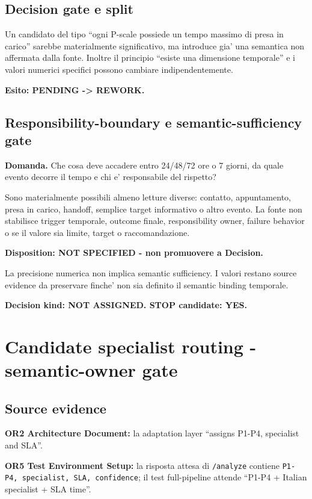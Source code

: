 \documentclass[11pt,a4paper]{article}
\begin{document}
\subsection{Decision gate e split}
Un candidato del tipo ``ogni P-scale possiede un tempo massimo di presa in carico'' sarebbe materialmente significativo, ma introduce gia' una semantica non affermata dalla fonte. Inoltre il principio ``esiste una dimensione temporale'' e i valori numerici specifici possono cambiare indipendentemente.\par
\textbf{Esito: PENDING -> REWORK.}

\subsection{Responsibility-boundary e semantic-sufficiency gate}
\begin{ddtacheck}
\textbf{Domanda.} Che cosa deve accadere entro 24/48/72 ore o 7 giorni, da quale evento decorre il tempo e chi e' responsabile del rispetto?
\end{ddtacheck}

Sono materialmente possibili almeno letture diverse: contatto, appuntamento, presa in carico, handoff, semplice target informativo o altro evento. La fonte non stabilisce trigger temporale, outcome finale, responsibility owner, failure behavior o se il valore sia limite, target o raccomandazione.

\begin{ddtaopen}[title={GAP-DERMA-SLA-01}]
\textbf{Disposition: NOT SPECIFIED - non promuovere a Decision.}\par
La precisione numerica non implica semantic sufficiency. I valori restano source evidence da preservare finche' non sia definito il semantic binding temporale.
\end{ddtaopen}

\textbf{Decision kind: NOT ASSIGNED. STOP candidate: YES.}

\section{Candidate specialist routing - semantic-owner gate}
\holdouttag

\subsection{Source evidence}
\textbf{OR2 Architecture Document:} la adaptation layer ``assigns P1-P4, specialist and SLA''.\par
\textbf{OR5 Test Environment Setup:} la risposta attesa di \texttt{/analyze} contiene \texttt{P1-P4, specialist, SLA, confidence}; il test full-pipeline attende ``P1-P4 + Italian specialist + SLA time''.
\end{document}
